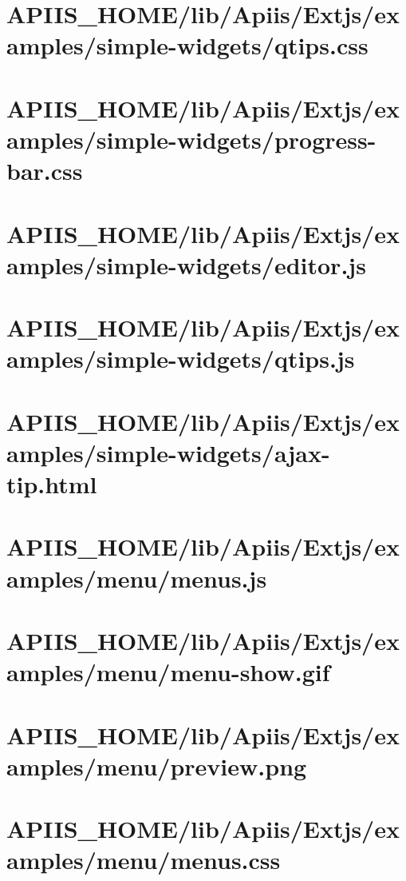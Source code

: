 \section{APIIS\_HOME/lib/Apiis/Extjs/examples/simple-widgets/qtips.css} 
\section{APIIS\_HOME/lib/Apiis/Extjs/examples/simple-widgets/progress-bar.css} 
\section{APIIS\_HOME/lib/Apiis/Extjs/examples/simple-widgets/editor.js} 
\section{APIIS\_HOME/lib/Apiis/Extjs/examples/simple-widgets/qtips.js} 
\section{APIIS\_HOME/lib/Apiis/Extjs/examples/simple-widgets/ajax-tip.html} 
\section{APIIS\_HOME/lib/Apiis/Extjs/examples/menu/menus.js} 
\section{APIIS\_HOME/lib/Apiis/Extjs/examples/menu/menu-show.gif} 
\section{APIIS\_HOME/lib/Apiis/Extjs/examples/menu/preview.png} 
\section{APIIS\_HOME/lib/Apiis/Extjs/examples/menu/menus.css} 
